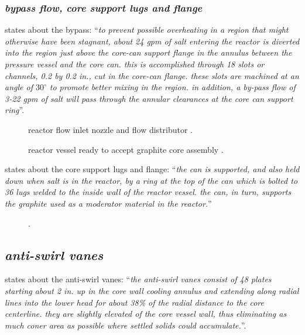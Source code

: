 \documentclass[ms,a4paper]{memoir}
\newcommand*{\mrsarchive}{../../msr-archive}%
\begin{document}
\subsubsection{\emph{bypass flow, core support lugs and flange}}
\parencite[page 85]{ornl-tm-0728} states about the bypass:
\enquote{\textit{to prevent possible overheating in a region that might otherwise have been stagnant, about 24 gpm of salt entering the reactor is diverted into the region just above the core-can support flange in the annulus between the pressure vessel and the core can. this is accomplished through 18 slots or channels, 0.2 by 0.2 in., cut in the core-can flange. these slots are machined at an angle of $30^\circ$ to promote better mixing in the region. in addition, a by-pass flow of 3-22 gpm of salt will pass through the annular clearances at the core can support ring}}.

\begin{figure}[H]
  \centering
  \caption{reactor flow inlet nozzle and flow distributor \parencite[figure 38]{ornl-3708}.}
\end{figure}

\begin{figure}[H]
  \centering
  \caption{reactor vessel ready to accept graphite core assembly \parencite[figure 39]{ornl-3708}.}
  \label{3708-fig39}
\end{figure}

\parencite[page 79]{ornl-tm-0728} states about the core support lugs and flange:
\enquote{\textit{the can is supported, and also held down when salt is in the reactor, by a ring at the top of the can which is bolted to 36 lugs welded to the inside wall of the reactor vessel. the can, in turn, supports the graphite used as a moderator material in the reactor.}}

\begin{figure}[H]
  \centering
  \caption{ \parencite[figure 39]{ornl-3626}.}
  \label{3626-fig1-3}
\end{figure}

\subsection{\emph{anti-swirl vanes}}
\textcite[page 14]{ornl-tm-3229} states about the anti-swirl vanes:
\enquote{\textit{the anti-swirl vanes consist of 48 plates starting about 2 in. up in the core wall cooling annulus and extending along radial lines into the lower head for about 38\% of the radial distance to the core centerline. they are slightly elevated of the core vessel wall, thus eliminating as much coner area as possible where settled solids could accumulate.}}. \\
\end{document}
